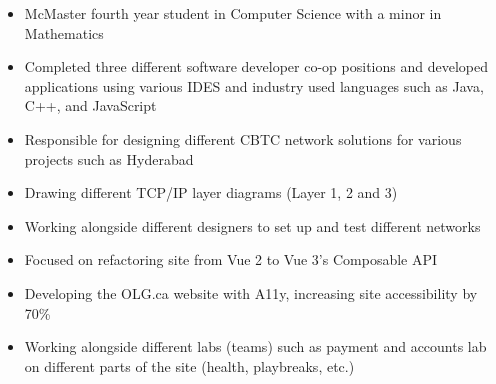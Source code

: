 \documentclass[10pt,a4paper,ragged2e,withhyper,darkmode]{altacv}
\begin{document}

\makecvheader
\begin{paracol}{1}


  \begin{itemize}
    \item {McMaster fourth year student in Computer Science with a minor in Mathematics}
    \item {Completed three different software developer co-op positions and developed applications using various IDES and industry used languages such as Java, C++, and JavaScript}
  \end{itemize}




  \begin{itemize}
    \item{Responsible for designing different CBTC network solutions for various projects such as Hyderabad}
    \item{Drawing different TCP/IP layer diagrams (Layer 1, 2 and 3)}
    \item{Working alongside different designers to set up and test different networks}
  \end{itemize}

  \begin{itemize}
    \item{Focused on refactoring site from Vue 2 to Vue 3's Composable API}
    \item{Developing the OLG.ca website with A11y, increasing site accessibility by 70\%}
    \item{Working alongside different labs (teams) such as payment and accounts lab on different parts of the site (health, playbreaks, etc.)}
  \end{itemize}


\end{paracol}
\end{document}
